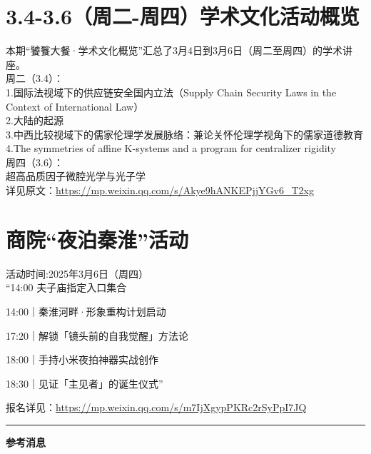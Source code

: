 \documentclass[letterpaper, 12pt]{article}
\begin{document}
\begin{multicols}{2}
\section{3.4-3.6（周二-周四）学术文化活动概览}
本期“饕餮大餐·学术文化概览”汇总了3月4日到3月6日（周二至周四）的学术讲座。\\
周二（3.4）：\\
1.国际法视域下的供应链安全国内立法（Supply Chain Security Laws in the Context of International Law）\\
2.大陆的起源\\
3.中西比较视域下的儒家伦理学发展脉络：兼论关怀伦理学视角下的儒家道德教育\\
4.The symmetries of affine K-systems and a program for centralizer rigidity\\
周四（3.6）：\\
超高品质因子微腔光学与光子学\\
详见原文：\url{https://mp.weixin.qq.com/s/Akye9hANKEPjjYGv6_T2xg}
\section{商院“夜泊秦淮”活动}
活动时间:2025年3月6日（周四）\\

“14:00 夫子庙指定入口集合

14:00｜秦淮河畔·形象重构计划启动

17:20｜解锁「镜头前的自我觉醒」方法论

18:00｜手持小米夜拍神器实战创作

18:30｜见证「主见者」的诞生仪式”

报名详见：\url{https://mp.weixin.qq.com/s/m7IjXgypPKRc2rSyPpI7JQ}
\end{multicols} 
\hrule
\vspace{4mm}
\centerline{\huge\textbf{参考消息}}
\end{document}
